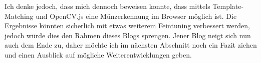 Ich denke jedoch, dass mich dennoch beweisen konnte, dass mittels Template-Matching und OpenCV.js eine Münzerkennung im Browser möglich ist. Die Ergebnisse könnten sicherlich mit etwas weiterem Feintuning verbessert werden, jedoch würde dies den Rahmen dieses Blogs sprengen. Jener Blog neigt sich nun auch dem Ende zu, daher möchte ich im nächsten Abschnitt noch ein Fazit ziehen und einen Ausblick auf mögliche Weiterentwicklungen geben.